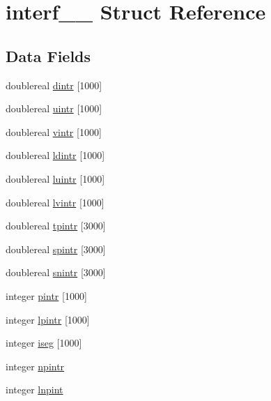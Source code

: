 \hypertarget{structinterf__1__}{}\section{interf\+\_\+\_\+ Struct Reference}
\label{structinterf__1__}
\subsection*{Data Fields}
\begin{DoxyCompactItemize}
\item 
doublereal \hyperlink{structinterf__1___af5f138bef0bd2ea5e6a5376ef5cac971}{dintr} \mbox{[}1000\mbox{]}
\item 
doublereal \hyperlink{structinterf__1___ac024932f4ad99bdab574604dbfe1fbca}{uintr} \mbox{[}1000\mbox{]}
\item 
doublereal \hyperlink{structinterf__1___acbe062f4078a10eb4b3aba61e54f0576}{vintr} \mbox{[}1000\mbox{]}
\item 
doublereal \hyperlink{structinterf__1___a023732e5c1db84b6c0af1e27f0b0a3ac}{ldintr} \mbox{[}1000\mbox{]}
\item 
doublereal \hyperlink{structinterf__1___aa5a09cbc8009ff8ca789af3921b2d8d8}{luintr} \mbox{[}1000\mbox{]}
\item 
doublereal \hyperlink{structinterf__1___aa9491f2ae4fa6812be83c1ad81af9de4}{lvintr} \mbox{[}1000\mbox{]}
\item 
doublereal \hyperlink{structinterf__1___a32d34302e76a924d07ba60ea1329446d}{tpintr} \mbox{[}3000\mbox{]}
\item 
doublereal \hyperlink{structinterf__1___aede0bcb6b94433e9eda17d0c8a4d87e4}{spintr} \mbox{[}3000\mbox{]}
\item 
doublereal \hyperlink{structinterf__1___a9acfb561f17d6843f01550b17486e5c3}{snintr} \mbox{[}3000\mbox{]}
\item 
integer \hyperlink{structinterf__1___ab975e100c5c471eab953f800bcb88a95}{pintr} \mbox{[}1000\mbox{]}
\item 
integer \hyperlink{structinterf__1___ad5bbd72f558be286c578c06e304bc9b5}{lpintr} \mbox{[}1000\mbox{]}
\item 
integer \hyperlink{structinterf__1___a9543ed85a0f65d46f5c17c303d48c71a}{iseg} \mbox{[}1000\mbox{]}
\item 
integer \hyperlink{structinterf__1___a66c11d93cf0173208c66cae678a6b948}{npintr}
\item 
integer \hyperlink{structinterf__1___acb41dcd3607da9a107db4e6ba628c049}{lnpint}
\end{DoxyCompactItemize}


